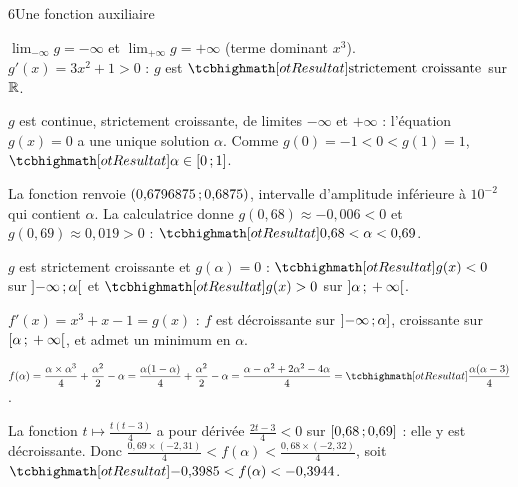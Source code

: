 \begin{corrige}{6}{Une fonction auxiliaire}
\begin{questions}
  \item $\lim_{-\infty}g=-\infty$ et $\lim_{+\infty}g=+\infty$ (terme dominant $x^{3}$).\\
    $g'(x)=3x^{2}+1>0$ : $g$ est $\res{\text{strictement croissante}}$ sur $\mathbb{R}$.
  \item $g$ est continue, strictement croissante, de limites $-\infty$ et $+\infty$ : l'équation $g(x)=0$ a une unique solution
    $\alpha$. Comme $g(0)=-1<0<g(1)=1$, $\res{\alpha\in\intFF{0}{1}}$.
  \item La fonction renvoie $(0{,}6796875\,{;}\,0{,}6875)$, intervalle d'amplitude inférieure à $10^{-2}$ qui contient $\alpha$.
    La calculatrice donne $g(0{,}68)\approx-0{,}006<0$ et $g(0{,}69)\approx0{,}019>0$ : $\res{0{,}68<\alpha<0{,}69}$.
  \item $g$ est strictement croissante et $g(\alpha)=0$ : $\res{g(x)<0}$ sur $\mathopen{]}-\infty\,{;}\,\alpha\mathclose{[}$ et $\res{g(x)>0}$ sur $\mathopen{]}\alpha\,{;}\,+\infty\mathclose{[}$.
\end{questions}
\begin{questions}[resume]
  \item $f'(x)=x^{3}+x-1=g(x)$ : $f$ est décroissante sur $\mathopen{]}-\infty\,{;}\,\alpha\mathclose{]}$, croissante sur $\mathopen{[}\alpha\,{;}\,+\infty\mathclose{[}$,
    et admet un minimum en $\alpha$.
  \item $f(\alpha)=\dfrac{\alpha\times\alpha^{3}}{4}+\dfrac{\alpha^{2}}{2}-\alpha=\dfrac{\alpha(1-\alpha)}{4}+\dfrac{\alpha^{2}}{2}-\alpha
    =\dfrac{\alpha-\alpha^{2}+2\alpha^{2}-4\alpha}{4}=\res{\dfrac{\alpha(\alpha-3)}{4}}$.
  \item La fonction $t\mapsto\frac{t(t-3)}{4}$ a pour dérivée $\frac{2t-3}{4}<0$ sur $\mathopen{[}0{,}68\,{;}\,0{,}69\mathclose{]}$ : elle y est décroissante.
    Donc $\frac{0{,}69\times(-2{,}31)}{4}<f(\alpha)<\frac{0{,}68\times(-2{,}32)}{4}$, soit $\res{-0{,}3985<f(\alpha)<-0{,}3944}$.
\end{questions}
\end{corrige}

